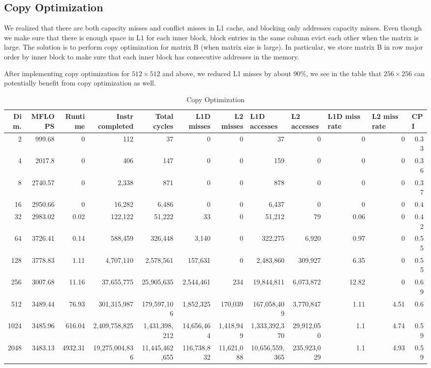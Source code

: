 \documentclass{article}
\begin{document}
\subsection{Copy Optimization}
We realized that there are both capacity misses and conflict misses in L1 cache, and blocking only addresses capacity misses.  Even though we make sure that there is enough space in L1 for each inner block, block entries in the same column evict each other when the matrix is large.  The solution is to perform copy optimization for matrix B (when matrix size is large).  In particular, we store matrix B in row major order by inner block to make sure that each inner block has consecutive addresses in the memory.

After implementing copy optimization for $512\times512$ and above, we reduced L1 misses by about 90\%, we see in the table that $256\times256$ can potentially benefit from copy optimization as well.

\begin{table}[htbp]
\tiny
\caption{Copy Optimization}
\begin{tabular}{|r|r|r|r|r|r|r|r|r|r|r|r|}
\hline
Dim. &   MFLOPS &     Runtime & Instr completed & Total cycles & L1D misses & L2 misses & \multicolumn{1}{l|}{L1D accesses} & \multicolumn{1}{l|}{ L2 accesses} & \multicolumn{1}{l|}{L1D miss rate} & \multicolumn{1}{l|}{L2 miss rate} & \multicolumn{1}{l|}{CPI} \\ \hline
2 & 999.68 & 0 & 112 & 37 & 0 & 0 & 37 & 0 & 0 & 0 & 0.33 \\ \hline
4 & 2017.8 & 0 & 406 & 147 & 0 & 0 & 159 & 0 & 0 & 0 & 0.36 \\ \hline
8 & 2740.57 & 0 & 2,338 & 871 & 0 & 0 & 878 & 0 & 0 & 0 & 0.37 \\ \hline
16 & 2950.66 & 0 & 16,282 & 6,486 & 0 & 0 & 6,437 & 0 & 0 & 0 & 0.4 \\ \hline
32 & 2983.02 & 0.02 & 122,122 & 51,222 & 33 & 0 & 51,212 & 79 & 0.06 & 0 & 0.42 \\ \hline
64 & 3726.41 & 0.14 & 588,459 & 326,448 & 3,140 & 0 & 322,275 & 6,920 & 0.97 & 0 & 0.55 \\ \hline
128 & 3778.83 & 1.11 & 4,707,110 & 2,578,561 & 157,631 & 0 & 2,483,860 & 309,927 & 6.35 & 0 & 0.55 \\ \hline
256 & 3007.68 & 11.16 & 37,655,775 & 25,905,635 & 2,544,461 & 234 & 19,844,811 & 6,073,872 & 12.82 & 0 & 0.69 \\ \hline
512 & 3489.44 & 76.93 & 301,315,987 & 179,597,106 & 1,852,325 & 170,039 & 167,058,409 & 3,770,847 & 1.11 & 4.51 & 0.6 \\ \hline
1024 & 3485.96 & 616.04 & 2,409,758,825 & 1,431,398,212 & 14,656,464 & 1,418,949 & 1,333,392,370 & 29,912,050 & 1.1 & 4.74 & 0.59 \\ \hline
2048 & 3483.13 & 4932.31 & 19,275,004,836 & 11,445,462,655 & 116,738,832 & 11,621,088 & 10,656,559,365 & 235,923,029 & 1.1 & 4.93 & 0.59 \\ \hline
\end{tabular}
\label{}
\end{table}
\end{document}
